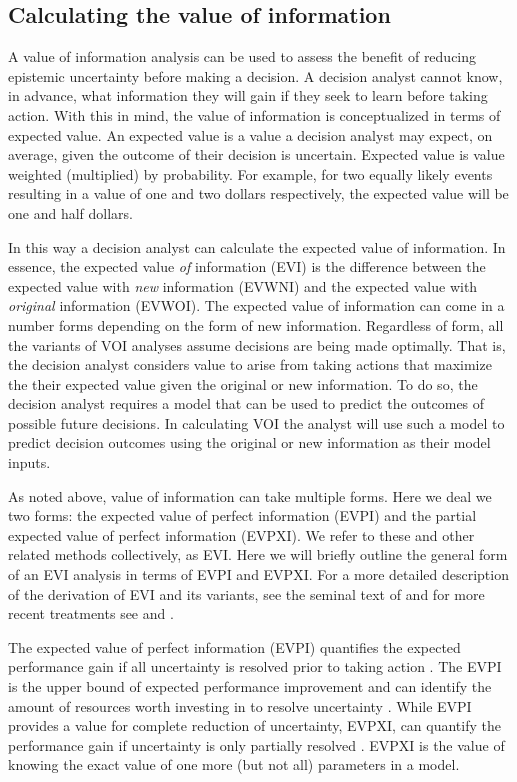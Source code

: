 \documentclass[]{article}
\begin{document}
\subsection{Calculating the value of
information}\label{calculating-the-value-of-information}

A value of information analysis can be used to assess the benefit of
reducing epistemic uncertainty before making a decision. A decision
analyst cannot know, in advance, what information they will gain if they
seek to learn before taking action. With this in mind, the value of
information is conceptualized in terms of expected value. An expected
value is a value a decision analyst may expect, on average, given the
outcome of their decision is uncertain. Expected value is value weighted
(multiplied) by probability. For example, for two equally likely events
resulting in a value of one and two dollars respectively, the expected
value will be one and half dollars.

In this way a decision analyst can calculate the expected value of
information. In essence, the expected value \emph{of} information (EVI)
is the difference between the expected value with \emph{new} information
(EVWNI) and the expected value with \emph{original} information (EVWOI).
The expected value of information can come in a number forms depending
on the form of new information. Regardless of form, all the variants of
VOI analyses assume decisions are being made optimally. That is, the
decision analyst considers value to arise from taking actions that
maximize the their expected value given the original or new information.
To do so, the decision analyst requires a model that can be used to
predict the outcomes of possible future decisions. In calculating VOI
the analyst will use such a model to predict decision outcomes using the
original or new information as their model inputs.

As noted above, value of information can take multiple forms. Here we
deal we two forms: the expected value of perfect information (EVPI) and
the partial expected value of perfect information (EVPXI). We refer to
these and other related methods collectively, as EVI. Here we will
briefly outline the general form of an EVI analysis in terms of EVPI and
EVPXI. For a more detailed description of the derivation of EVI and its
variants, see the seminal text of \citet{Raiffa1968} and for more recent
treatments see \citet{Yokota2004} and \citet{Williams2011}.

The expected value of perfect information (EVPI) quantifies the expected
performance gain if all uncertainty is resolved prior to taking action
\citep{Raiffa1968}. The EVPI is the upper bound of expected performance
improvement and can identify the amount of resources worth investing in
to resolve uncertainty \citep{Runge2011}. While EVPI provides a value
for complete reduction of uncertainty, EVPXI, can quantify the
performance gain if uncertainty is only partially resolved
\citep{Ades2004}. EVPXI is the value of knowing the exact value of one
more (but not all) parameters in a model.
\end{document}
